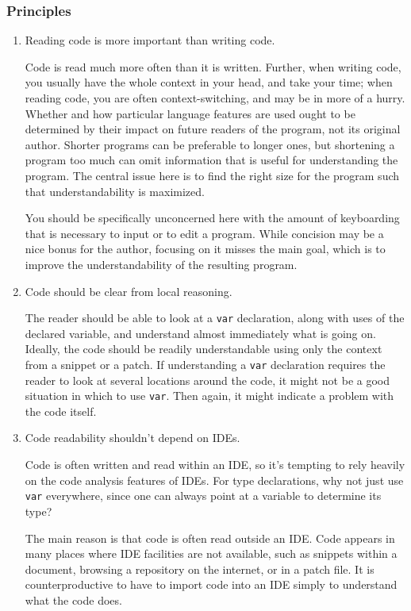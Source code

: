 \documentclass[11pt,a4paper, titlepage, parskip=half, headsepline, footsepline, cleardoublepage=current, headheight=1cm]{scrbook}
\begin{document}
\subsubsection{Principles}
\begin{enumerate}[label=P\arabic*.]
\item{Reading code is more important than writing code.

Code is read much more often than it is written. Further, when writing code, you usually have the whole context in your head, and take your time; when reading code, you are often context-switching, and may be in more of a hurry. Whether and how particular language features are used ought to be determined by their impact on future readers of the program, not its original author. Shorter programs can be preferable to longer ones, but shortening a program too much can omit information that is useful for understanding the program. The central issue here is to find the right size for the program such that understandability is maximized.

You should be specifically unconcerned here with the amount of keyboarding that is necessary to input or to edit a program. While concision may be a nice bonus for the author, focusing on it misses the main goal, which is to improve the understandability of the resulting program.}

\item{Code should be clear from local reasoning.

The reader should be able to look at a \lstinline|var| declaration, along with uses of the declared variable, and understand almost immediately what is going on. Ideally, the code should be readily understandable using only the context from a snippet or a patch. If understanding a \lstinline|var| declaration requires the reader to look at several locations around the code, it might not be a good situation in which to use \lstinline|var|. Then again, it might indicate a problem with the code itself.}

\item{Code readability shouldn’t depend on IDEs.

Code is often written and read within an IDE, so it’s tempting to rely heavily on the code analysis features of IDEs. For type declarations, why not just use \lstinline|var| everywhere, since one can always point at a variable to determine its type?

The main reason is that code is often read outside an IDE. Code appears in many places where IDE facilities are not available, such as snippets within a document, browsing a repository on the internet, or in a patch file. It is counterproductive to have to import code into an IDE simply to understand what the code does.

}
\end{enumerate}
\end{document}
